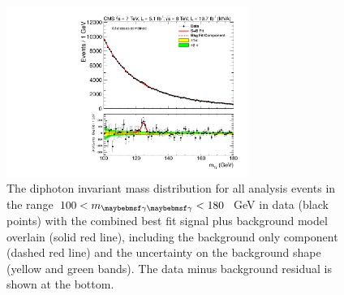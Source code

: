 \begin{figure}
  \includegraphics[width=0.7\textwidth]{results/plots/mgg_mva_fullrange_combcat78TeV_unweighted.pdf}
  \caption[The unweighted diphoton invariant mass distribution for all analysis events in data with the combined best fit signal plus background model overlain.]{The diphoton invariant mass distribution for all analysis events in the range $100<\mgg<180$~GeV in data (black points) with the combined best fit signal plus background model overlain (solid red line), including the background only component (dashed red line) and the uncertainty on the background shape (yellow and green bands). The data minus background residual is shown at the bottom.}
  \label{fig:sbfit_unw}
\end{figure}

